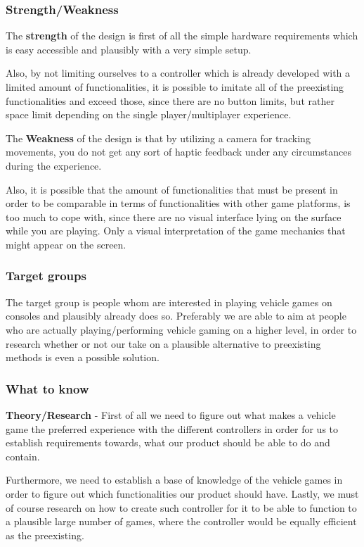 \subsubsection*{Strength/Weakness}
The \textbf{strength} of the design is first of all the simple hardware requirements which is easy accessible and plausibly with a very simple setup. 
\bigskip

Also, by not limiting ourselves to a controller which is already developed with a limited amount of functionalities, it is possible to imitate all of the preexisting functionalities and exceed those, since there are no button limits, but rather space limit depending on the single player/multiplayer experience.
\bigskip

The \textbf{Weakness} of the design is that by utilizing a camera for tracking movements, you do not get any sort of haptic feedback under any circumstances during the experience.
\bigskip

Also, it is possible that the amount of functionalities that must be present in order to be comparable in terms of functionalities with other game platforms, is too much to cope with, since there are no visual interface lying on the surface while you are playing. Only a visual interpretation of the game mechanics that might appear on the screen.

\subsubsection*{Target groups}
The target group is people whom are interested in playing vehicle games on consoles and plausibly already does so. Preferably we are able to aim at people who are actually playing/performing vehicle gaming on a higher level, in order to research whether or not our take on a plausible alternative to preexisting methods is even a possible solution.

\subsubsection*{What to know}
\noindent\textbf{Theory/Research} - First of all we need to figure out what makes a vehicle game the preferred experience with the different controllers in order for us to establish requirements towards, what our product should be able to do and contain.
\bigskip

Furthermore, we need to establish a base of knowledge of the vehicle games in order to figure out which functionalities our product should have. Lastly, we must of course research on how to create such controller for it to be able to function to a plausible large number of games, where the controller would be equally efficient as the preexisting. 
\bigskip

